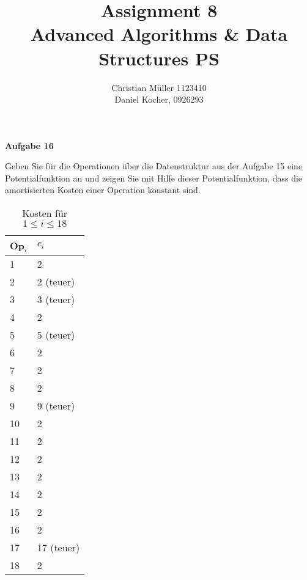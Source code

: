 \documentclass{article}
\begin{document}
\title{Assignment 8 \\ Advanced Algorithms \& Data Structures PS}%
\author{Christian Müller 1123410 \\ Daniel Kocher, 0926293}%
\maketitle

{\bfseries Aufgabe 16}%

Geben Sie f{\"u}r die Operationen {\"u}ber die Datenstruktur aus der Aufgabe 15
eine Potentialfunktion an und zeigen Sie mit Hilfe dieser Potentialfunktion, dass
die amortisierten Kosten einer Operation konstant sind.

\begin{minipage}{.35\textwidth}
\begin{table}[H]
  \centering
  \begin{tabular}{l|l}
    Op$_i$  & $c_i$       \tabularnewline
    \hline\hline
    1       & 2           \tabularnewline
    2       & 2 (teuer)   \tabularnewline
    3       & 3 (teuer)   \tabularnewline
    4       & 2           \tabularnewline
    5       & 5 (teuer)   \tabularnewline
    6       & 2           \tabularnewline
    7       & 2           \tabularnewline
    8       & 2           \tabularnewline
    9       & 9 (teuer)   \tabularnewline
    10      & 2           \tabularnewline
    11      & 2           \tabularnewline
    12      & 2           \tabularnewline
    13      & 2           \tabularnewline
    14      & 2           \tabularnewline
    15      & 2           \tabularnewline
    16      & 2           \tabularnewline
    17      & 17 (teuer)  \tabularnewline
    18      & 2           \tabularnewline
    \hline
  \end{tabular}
  \caption{Kosten f{\"u}r $1 \leq i \leq 18$}
  \label{tbl:costs}
\end{table}
\end{minipage}
\end{document}
